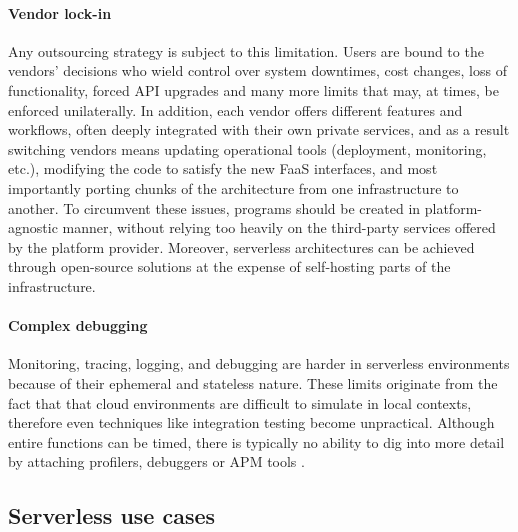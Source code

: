 \paragraph{\textbf{Vendor lock-in}} Any outsourcing strategy is subject to this limitation.
Users are bound to the vendors' decisions who wield control over
system downtimes, cost changes, loss of functionality, forced API upgrades and many
more limits that may, at times, be enforced unilaterally.
In addition, each vendor offers different features and workflows,
often deeply integrated with their own private services,
and as a result switching vendors means updating operational tools (deployment, monitoring, etc.),
modifying the code to satisfy the new FaaS interfaces, and most importantly
porting chunks of the architecture from one infrastructure to another.
To circumvent these issues, programs should be created in platform-agnostic manner,
without relying too heavily on the third-party services offered by the platform provider.
Moreover, serverless architectures can be achieved through open-source solutions
at the expense of self-hosting parts of the infrastructure.

\paragraph{\textbf{Complex debugging}} Monitoring, tracing, logging, and debugging
are harder in serverless environments because of their ephemeral and stateless nature.
These limits originate from the fact that that cloud environments are difficult
to simulate in local contexts, therefore even techniques like integration testing become unpractical.
Although entire functions can be timed, there is typically no
ability to dig into more detail by attaching profilers, debuggers or APM tools \cite{debug}.

\subsection{Serverless use cases}

